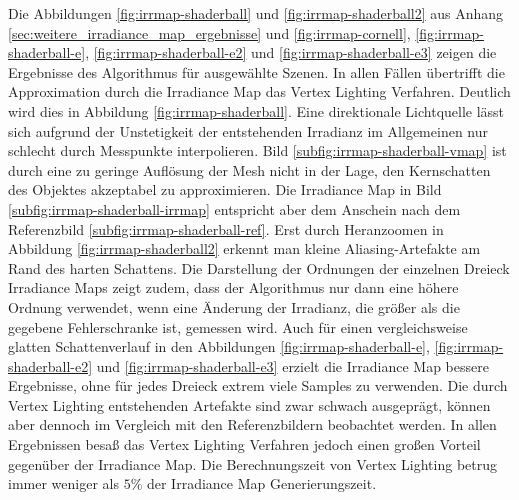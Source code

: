 		Die Abbildungen \ref{fig:irrmap-shaderball} und \ref{fig:irrmap-shaderball2} aus Anhang \ref{sec:weitere_irradiance_map_ergebnisse} und \ref{fig:irrmap-cornell}, \ref{fig:irrmap-shaderball-e}, \ref{fig:irrmap-shaderball-e2} und \ref{fig:irrmap-shaderball-e3} zeigen die Ergebnisse des Algorithmus für ausgewählte Szenen.
		In allen Fällen übertrifft die Approximation durch die Irradiance Map das Vertex Lighting Verfahren.
		Deutlich wird dies in Abbildung \ref{fig:irrmap-shaderball}.
		Eine direktionale Lichtquelle lässt sich aufgrund der Unstetigkeit der entstehenden Irradianz im Allgemeinen nur schlecht durch Messpunkte interpolieren.
		Bild \ref{subfig:irrmap-shaderball-vmap} ist durch eine zu geringe Auflösung der Mesh nicht in der Lage, den Kernschatten des Objektes akzeptabel zu approximieren.
		Die Irradiance Map in Bild \ref{subfig:irrmap-shaderball-irrmap} entspricht aber dem Anschein nach dem Referenzbild \ref{subfig:irrmap-shaderball-ref}.
		Erst durch Heranzoomen in Abbildung \ref{fig:irrmap-shaderball2} erkennt man kleine Aliasing-Artefakte am Rand des harten Schattens.
		Die Darstellung der Ordnungen der einzelnen Dreieck Irradiance Maps zeigt zudem, dass der Algorithmus nur dann eine höhere Ordnung verwendet, wenn eine Änderung der Irradianz, die größer als die gegebene Fehlerschranke ist, gemessen wird.
		Auch für einen vergleichsweise glatten Schattenverlauf in den Abbildungen \ref{fig:irrmap-shaderball-e}, \ref{fig:irrmap-shaderball-e2} und \ref{fig:irrmap-shaderball-e3} erzielt die Irradiance Map bessere Ergebnisse, ohne für jedes Dreieck extrem viele Samples zu verwenden.
		Die durch Vertex Lighting entstehenden Artefakte sind zwar schwach ausgeprägt, können aber dennoch im Vergleich mit den Referenzbildern beobachtet werden.
		In allen Ergebnissen besaß das Vertex Lighting Verfahren jedoch einen großen Vorteil gegenüber der Irradiance Map.
		Die Berechnungszeit von Vertex Lighting betrug immer weniger als $5\unit{\%}$ der Irradiance Map Generierungszeit.

